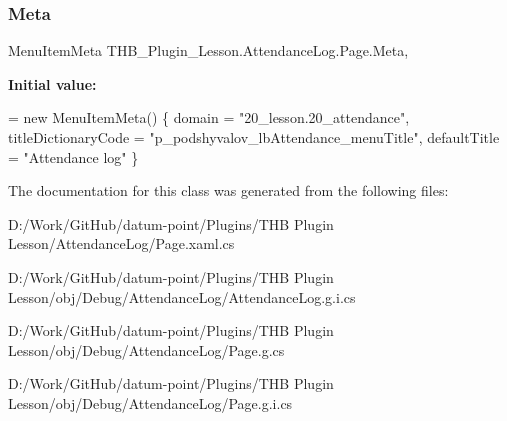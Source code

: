 \subsubsection{\texorpdfstring{Meta}{Meta}}
{\footnotesize\ttfamily Menu\+Item\+Meta T\+H\+B\+\_\+\+Plugin\+\_\+\+Lesson.\+Attendance\+Log.\+Page.\+Meta\hspace{0.3cm}{\ttfamily [get]}, {\ttfamily [set]}}

{\bfseries Initial value\+:}
\begin{DoxyCode}
= \textcolor{keyword}{new} MenuItemMeta()
        \{
            domain = \textcolor{stringliteral}{"20\_lesson.20\_attendance"},
            titleDictionaryCode = \textcolor{stringliteral}{"p\_podshyvalov\_lbAttendance\_menuTitle"},
            defaultTitle = \textcolor{stringliteral}{"Attendance log"}
        \}
\end{DoxyCode}


The documentation for this class was generated from the following files\+:\begin{DoxyCompactItemize}
\item 
D\+:/\+Work/\+Git\+Hub/datum-\/point/\+Plugins/\+T\+H\+B Plugin Lesson/\+Attendance\+Log/Page.\+xaml.\+cs\item 
D\+:/\+Work/\+Git\+Hub/datum-\/point/\+Plugins/\+T\+H\+B Plugin Lesson/obj/\+Debug/\+Attendance\+Log/Attendance\+Log.\+g.\+i.\+cs\item 
D\+:/\+Work/\+Git\+Hub/datum-\/point/\+Plugins/\+T\+H\+B Plugin Lesson/obj/\+Debug/\+Attendance\+Log/Page.\+g.\+cs\item 
D\+:/\+Work/\+Git\+Hub/datum-\/point/\+Plugins/\+T\+H\+B Plugin Lesson/obj/\+Debug/\+Attendance\+Log/Page.\+g.\+i.\+cs\end{DoxyCompactItemize}
